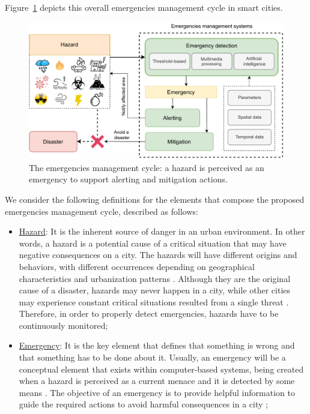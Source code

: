 \begin{refsection}
Figure~\ref{Fig:cycle} depicts this overall emergencies management cycle in smart cities. 

\begin{figure}[htbp]
  \centering
  \includegraphics[scale=0.85]{Chapters/1-Survey/images/newcycle.pdf}
  \caption{The emergencies management cycle: a hazard is perceived as an emergency to support alerting and mitigation actions.}\label{Fig:cycle}
\end{figure}

We consider the following definitions for the elements that compose the proposed emergencies management cycle, described as follows:

\begin{itemize}
  \item \underline{Hazard}: It is the inherent source of danger in an urban environment. In other words, a hazard is a potential cause of a critical situation that may have negative consequences on a city. The hazards will have different origins and behaviors, with different occurrences depending on geographical characteristics and urbanization patterns \cite{hazard1,hazard2}. Although they are the original cause of a disaster, hazards may never happen in a city, while other cities may experience constant critical situations resulted from a single threat \cite{hazard3}. Therefore, in order to properly detect emergencies, hazards have to be continuously monitored;
  
  \item \underline{Emergency}: It is the key element that defines that something is wrong and that something has to be done about it. Usually, an emergency will be a conceptual element that exists within computer-based systems, being created when a hazard is perceived as a current menace and it is detected by some means \cite{socialmedia1,citiesdisasters1}. The objective of an emergency is to provide helpful information to guide the required actions to avoid harmful consequences in a city \cite{emergenciesgeneral1};
  

\end{itemize}
\end{refsection}
